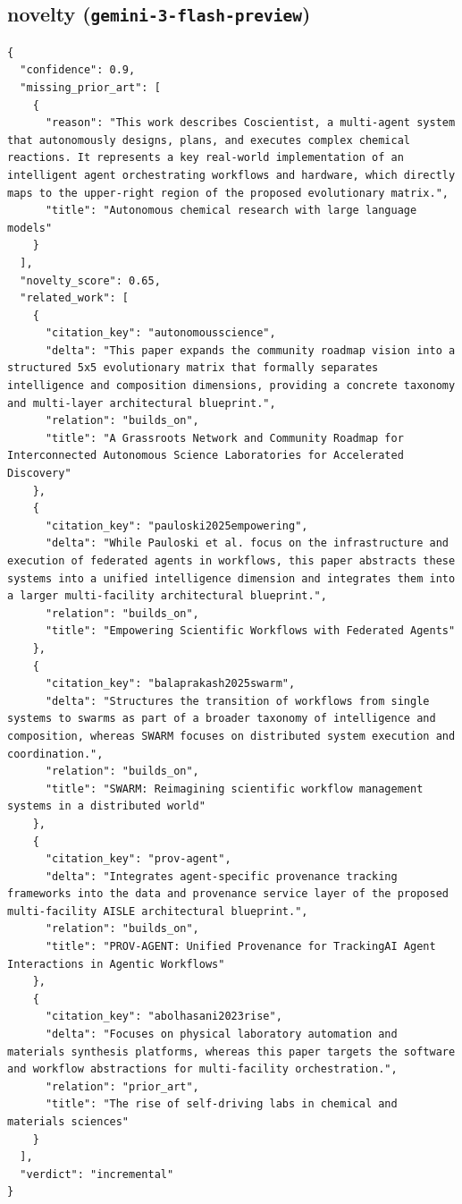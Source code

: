 \documentclass[11pt]{article}
\begin{document}
\subsection*{novelty (\texttt{gemini-3-flash-preview})}
\begin{verbatim}
{
  "confidence": 0.9,
  "missing_prior_art": [
    {
      "reason": "This work describes Coscientist, a multi-agent system that autonomously designs, plans, and executes complex chemical reactions. It represents a key real-world implementation of an intelligent agent orchestrating workflows and hardware, which directly maps to the upper-right region of the proposed evolutionary matrix.",
      "title": "Autonomous chemical research with large language models"
    }
  ],
  "novelty_score": 0.65,
  "related_work": [
    {
      "citation_key": "autonomousscience",
      "delta": "This paper expands the community roadmap vision into a structured 5x5 evolutionary matrix that formally separates intelligence and composition dimensions, providing a concrete taxonomy and multi-layer architectural blueprint.",
      "relation": "builds_on",
      "title": "A Grassroots Network and Community Roadmap for Interconnected Autonomous Science Laboratories for Accelerated Discovery"
    },
    {
      "citation_key": "pauloski2025empowering",
      "delta": "While Pauloski et al. focus on the infrastructure and execution of federated agents in workflows, this paper abstracts these systems into a unified intelligence dimension and integrates them into a larger multi-facility architectural blueprint.",
      "relation": "builds_on",
      "title": "Empowering Scientific Workflows with Federated Agents"
    },
    {
      "citation_key": "balaprakash2025swarm",
      "delta": "Structures the transition of workflows from single systems to swarms as part of a broader taxonomy of intelligence and composition, whereas SWARM focuses on distributed system execution and coordination.",
      "relation": "builds_on",
      "title": "SWARM: Reimagining scientific workflow management systems in a distributed world"
    },
    {
      "citation_key": "prov-agent",
      "delta": "Integrates agent-specific provenance tracking frameworks into the data and provenance service layer of the proposed multi-facility AISLE architectural blueprint.",
      "relation": "builds_on",
      "title": "PROV-AGENT: Unified Provenance for TrackingAI Agent Interactions in Agentic Workflows"
    },
    {
      "citation_key": "abolhasani2023rise",
      "delta": "Focuses on physical laboratory automation and materials synthesis platforms, whereas this paper targets the software and workflow abstractions for multi-facility orchestration.",
      "relation": "prior_art",
      "title": "The rise of self-driving labs in chemical and materials sciences"
    }
  ],
  "verdict": "incremental"
}
\end{verbatim}
\end{document}
